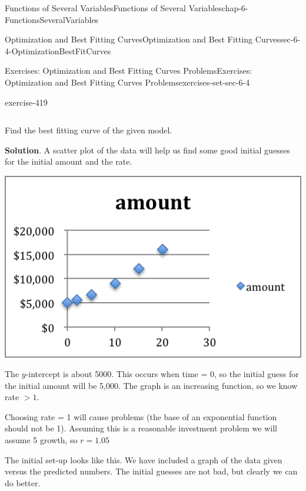 \documentclass[oneside,10pt,]{book}
\numberwithin{equation}{section}
\newcommand{\gt}{>}
\begin{document}
\begin{chapterptx}{Functions of Several Variables}{}{Functions of Several Variables}{}{}{chap-6-FunctionsSeveralVariables}
\begin{sectionptx}{Optimization and Best Fitting Curves}{}{Optimization and Best Fitting Curves}{}{}{sec-6-4-OptimizationBestFitCurves}
\begin{exercises-subsection-numberless}{Exercises: Optimization and Best Fitting Curves Problems}{}{Exercises: Optimization and Best Fitting Curves Problems}{}{}{exercises-set-sec-6-4}
\begin{divisionexercise}{5}{}{}{exercise-419}
\begin{sidebyside}{1}{0}{0}{0}
\begin{sbspanel}{1}
{\begin{tabular}{ccccccc}
\end{tabular}
\par}
\end{sbspanel}%
\end{sidebyside}%
\par
\hypertarget{p-2505}{}%
Find the best fitting curve of the given model.%
\par\smallskip%
\noindent\textbf{Solution}.\hypertarget{solution-212}{}\quad%
\hypertarget{p-2506}{}%
A scatter plot of the data will help us find some good initial guesses for the initial amount and the rate.%
\begin{sidebyside}{1}{0.2}{0.2}{0}%
\begin{sbspanel}{0.6}%
\includegraphics[width=1\linewidth]{images/sec6-4-sol5a.png}
\end{sbspanel}%
\end{sidebyside}%
\par
\hypertarget{p-2507}{}%
The \(y\)-intercept is about \textdollar{}5000. This occurs when time = 0, so the initial guess for the initial amount will be 5,000. The graph is an increasing function, so we know rate  \(\gt 1\).%
\par
\hypertarget{p-2508}{}%
Choosing rate = 1 will cause problems (the base of an exponential function should not be 1). Assuming this is a reasonable investment problem we will assume 5\textdollar{} growth, so \(r = 1.05\)%
\par
\hypertarget{p-2509}{}%
The initial set-up looks like this. We have included a graph of the data given versus the predicted numbers. The initial guesses are not bad, but clearly we can do better.%
\begin{sidebyside}{1}{0}{0}{0}%
\begin{sbspanel}{1}%

\end{sbspanel}
\end{sidebyside}
\end{divisionexercise}
\end{exercises-subsection-numberless}
\end{sectionptx}
\end{chapterptx}
\end{document}
